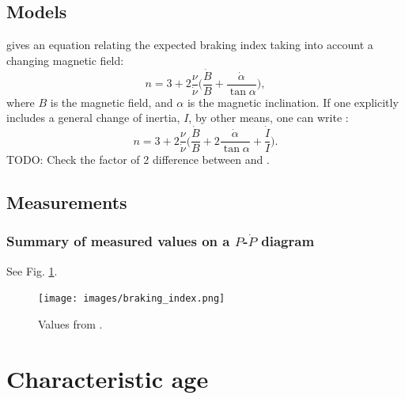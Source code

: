 \documentclass{book}
\newcommand{\todo}[1]{{\color{red}TODO: {#1}}}
\begin{document}
\subsection{Models}

\citet[][Eq. (7)]{Archibald2016} gives an equation relating the expected braking index taking into account a changing magnetic field:
\begin{equation}
  n = 3 + 2\frac{\nu}{\dot{\nu}} \bigg( \frac{\dot{B}}{B} + \frac{\dot{\alpha}}{\tan\alpha} \bigg),
\end{equation}
where $B$ is the magnetic field, and $\alpha$ is the magnetic inclination.
If one explicitly includes a general change of inertia, $I$, by other means, one can write \citep[cf.][]{Li2024}:
\begin{equation}
    n = 3 + 2\frac{\nu}{\dot{\nu}} \bigg( \frac{\dot{B}}{B} + 2\frac{\dot{\alpha}}{\tan\alpha} + \frac{\dot{I}}{I} \bigg).
\end{equation}
\todo{Check the factor of 2 difference between \citet{Archibald2016} and \citet{Li2024}.}

\subsection{Measurements}

\subsubsection{Summary of measured values on a $P$-$\dot{P}$ diagram}

See Fig. \ref{fig:braking_index_measurements}.
\begin{figure}[!t]
    \centering
    \texttt{[image: images/braking\_index.png]}
    \caption{Values from \citet{Archibald2016}.}
    \label{fig:braking_index_measurements}
\end{figure}


\section{Characteristic age}
\end{document}
